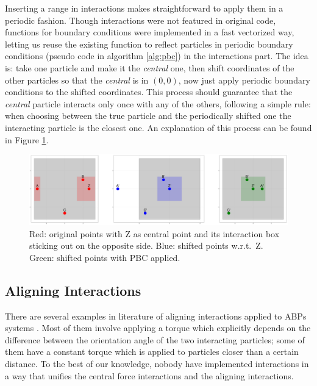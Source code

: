 \documentclass[../../master_thesis_np.tex]{subfiles}
\begin{document}
	Inserting a range in interactions makes straightforward to apply them in a periodic fashion. 
	Though interactions were not featured in original code, functions for boundary conditions were implemented in a fast vectorized way, letting us reuse the existing function to reflect particles in periodic boundary conditions (pseudo code in algorithm \ref{alg:pbc}) in the interactions part. 
	The idea is: take one particle and make it the \emph{central} one, then shift coordinates of the other particles so that the \emph{central} is in $(0,0)$, now just apply periodic boundary conditions to the shifted coordinates.
	This process should guarantee that the \emph{central} particle interacts only once with any of the others, following a simple rule: when choosing between the true particle and the periodically shifted one the interacting particle is the closest one.
	An explanation of this process can be found in Figure \ref{fig:periodicint}.
	
	\begin{figure}[htp]
		\centering
		\includegraphics[width=\textwidth]{periodic_interaction.png}
		\caption{Red: original points with Z as central point and its interaction box sticking out on the opposite side. Blue: shifted points w.r.t.\ Z. Green: shifted points with PBC applied.}
		\label{fig:periodicint}
	\end{figure}
	

	\subsection{Aligning Interactions} \label{alignint}

	There are several examples in literature of aligning interactions applied to ABPs systems \cite{martin-gomez_collective_2018, callegari_numerical_2019}.
	Most of them involve applying a torque which explicitly depends on the difference between the orientation angle of the two interacting particles; some of them have a constant torque which is applied to particles closer than a certain distance.
	{\color{brown}To the best of our knowledge, nobody have implemented interactions in a way that unifies the central force interactions and the aligning interactions.}
	
\end{document}
